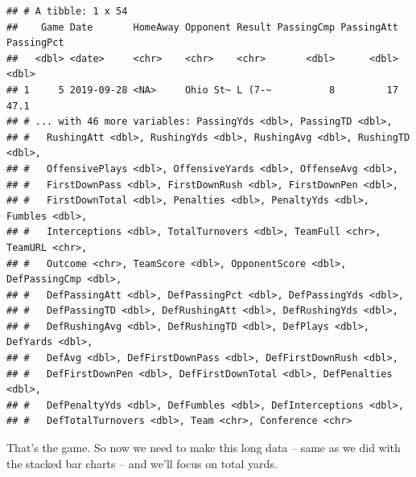 \documentclass[
]{book}
\newenvironment{Shaded}{\begin{snugshade}}{\end{snugshade}}
\newcommand{\DataTypeTok}[1]{\textcolor[rgb]{0.13,0.29,0.53}{#1}}
\newcommand{\KeywordTok}[1]{\textcolor[rgb]{0.13,0.29,0.53}{\textbf{#1}}}
\newcommand{\NormalTok}[1]{#1}
\newcommand{\OperatorTok}[1]{\textcolor[rgb]{0.81,0.36,0.00}{\textbf{#1}}}
\newcommand{\StringTok}[1]{\textcolor[rgb]{0.31,0.60,0.02}{#1}}
\begin{document}
\begin{verbatim}
## # A tibble: 1 x 54
##    Game Date       HomeAway Opponent Result PassingCmp PassingAtt PassingPct
##   <dbl> <date>     <chr>    <chr>    <chr>       <dbl>      <dbl>      <dbl>
## 1     5 2019-09-28 <NA>     Ohio St~ L (7-~          8         17       47.1
## # ... with 46 more variables: PassingYds <dbl>, PassingTD <dbl>,
## #   RushingAtt <dbl>, RushingYds <dbl>, RushingAvg <dbl>, RushingTD <dbl>,
## #   OffensivePlays <dbl>, OffensiveYards <dbl>, OffenseAvg <dbl>,
## #   FirstDownPass <dbl>, FirstDownRush <dbl>, FirstDownPen <dbl>,
## #   FirstDownTotal <dbl>, Penalties <dbl>, PenaltyYds <dbl>, Fumbles <dbl>,
## #   Interceptions <dbl>, TotalTurnovers <dbl>, TeamFull <chr>, TeamURL <chr>,
## #   Outcome <chr>, TeamScore <dbl>, OpponentScore <dbl>, DefPassingCmp <dbl>,
## #   DefPassingAtt <dbl>, DefPassingPct <dbl>, DefPassingYds <dbl>,
## #   DefPassingTD <dbl>, DefRushingAtt <dbl>, DefRushingYds <dbl>,
## #   DefRushingAvg <dbl>, DefRushingTD <dbl>, DefPlays <dbl>, DefYards <dbl>,
## #   DefAvg <dbl>, DefFirstDownPass <dbl>, DefFirstDownRush <dbl>,
## #   DefFirstDownPen <dbl>, DefFirstDownTotal <dbl>, DefPenalties <dbl>,
## #   DefPenaltyYds <dbl>, DefFumbles <dbl>, DefInterceptions <dbl>,
## #   DefTotalTurnovers <dbl>, Team <chr>, Conference <chr>
\end{verbatim}

That's the game. So now we need to make this long data -- same as we did with the stacked bar charts -- and we'll focus on total yards.

\begin{Shaded}
\end{Shaded}
\end{document}
